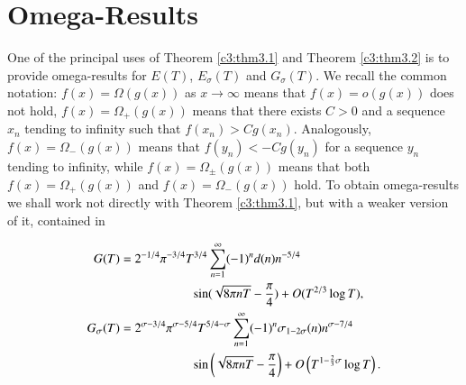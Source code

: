 \section{Omega-Results}\label{c3:sec3.2}

One of the principal uses of Theorem \ref{c3:thm3.1} and Theorem
\ref{c3:thm3.2} is to provide omega-results for $E(T)$, $E_\sigma(T)$
and $G_\sigma (T)$. We recall the common notation: $f(x) = \Omega
(g(x))$ as $x \to \infty$ means that $f(x) = o (g(x))$ does not hold,
$f(x) = \Omega_+ (g(x))$ means that there exists $C> 0$ and a sequence
$x_n$ tending to infinity such that $f(x_n)> Cg (x_n)$. Analogously,
$f(x) = \Omega_- (g(x))$ means that $f(y_n) < - Cg (y_n)$ for a
sequence $y_n$ tending to infinity, while $f(x) = \Omega_{\pm} (g(x))$
means that both $f(x)= \Omega_+ (g(x))$ and $f(x)= \Omega_- (g(x))$
hold. To obtain omega-results we shall work not directly with Theorem
\ref{c3:thm3.1}, but with a weaker version of it, contained in 

\begin{lemma}\label{c3:lem3.2}
  \begin{align}
    G(T) & = 2^{-1/4} \pi^{-3/4} T^{3/4} \sum_{n=1}^\infty (-1)^n d(n)
    n^{-5/4}\notag\\ 
    & \hspace{2cm}\sin (\sqrt{8 \pi nT}- \frac{\pi}{4})+ O(T^{2/3} \log
    T),\label{c3:eq3.28}\\
    G_\sigma (T) & = 2^{\sigma -3/4}\pi^{\sigma- 5/4}T^{5/4-\sigma}
    \sum_{n=1}^\infty (-1)^n \sigma_{1-2\sigma} (n) n^{\sigma- 7/4}\notag\\
    & \hspace{2cm}\sin \left(\sqrt{8 \pi n T}- \frac{\pi}{4}\right)+
    O\left(T^{1- \frac{2}{3}\sigma}\log T \right).\label{c3:eq3.29}
  \end{align}
\end{lemma}

